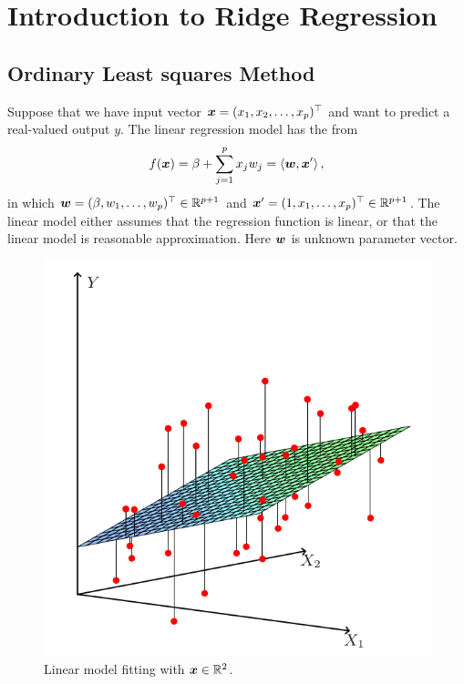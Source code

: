 \section{Introduction to Ridge Regression}

\subsection{Ordinary Least squares Method}
Suppose that we have input vector \(\bm{x} = (x_1, x_2, \dots, x_p)^\top\) and want
to predict a real-valued output \(y\). The linear regression model has the from
\begin{equation}\label{eq:lin-reg}
    f(\bm{x}) = \beta + \sum_{j=1}^p x_j w_j = \left\langle \bm{w},\bm{x}' \right\rangle,
\end{equation}
in which \(\bm{w} = (\beta, w_1, \dots, w_p)^\top \in \mathbb{R}^{p+1}\) and 
\(\bm{x}' = (1, x_1, \dots, x_p)^\top \in \mathbb{R}^{p+1}\). The linear model either assumes that
the regression function is linear, or that the linear model is reasonable approximation.
Here \(\bm{w}\) is unknown parameter vector.

\begin{figure}[!htbp]
    \centering
    \includegraphics[scale = 0.3]{fig/linear-model.png}
    \caption{Linear model fitting with \(\bm{x} \in \mathbb{R}^2\).}
    \label{fig:linear-model}
\end{figure}

